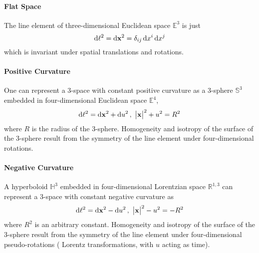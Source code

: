 \paragraph{Flat Space}

The line element of three-dimensional Euclidean space \(\mathbb{E}^{3}\) is just
%
\begin{equation}
    \dd{\ell^{2}}
    = \dd{\vb{x}^{2}}
    = \delta_{i j} \dd{x^{i}} \dd{x^{j}}
\end{equation}
%
which is invariant under spatial translations and rotations.

\paragraph{Positive Curvature}

One can represent a 3-space with constant positive curvature as a 3-sphere \(\mathbb{S}^{3}\) embedded in four-dimensional Euclidean space \(\mathbb{E}^{4}\),
%
\begin{equation}
    \dd{\ell^{2}}
    = \dd{\vb{x}^{2}} + \dd{u^{2}},\ \big\lvert\vb{x}\big\rvert^{2} + u^{2}
    = R^{2}
\end{equation}
%
where \(R\) is the radius of the 3-sphere.
Homogeneity and isotropy of the surface of the 3-sphere result from the symmetry of the line element under four-dimensional rotations.

\paragraph{Negative Curvature}

A hyperboloid \(\mathbb{H}^{3}\) embedded in four-dimensional Lorentzian space \(\mathbb{R}^{1,3}\) can represent a 3-space with constant negative curvature as
%
\begin{equation}
    \dd{\ell^{2}}
    = \dd{\vb{x}^{2}} - \dd{u^{2}},\ \big\lvert\vb{x}\big\rvert^{2} - u^{2}
    = -R^{2}
\end{equation}
%
where \(R^{2}\) is an arbitrary constant.
Homogeneity and isotropy of the surface of the 3-sphere result from the symmetry of the line element under four-dimensional pseudo-rotations (\ie{} Lorentz transformations, with \(u\) acting as time).

